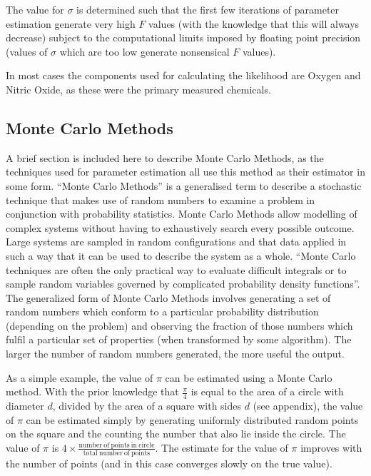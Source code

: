 The value for $\sigma$ is determined such that the first few iterations of parameter estimation generate very high $F$ values (with the knowledge that this will always decrease) subject to the computational limits imposed by floating point precision (values of $\sigma$ which are too low generate nonsensical $F$ values).

In most cases the components used for calculating the likelihood are Oxygen and Nitric Oxide, as these were the primary measured chemicals.
\subsection{Monte Carlo Methods}
A brief section is included here to describe Monte Carlo Methods, as the techniques used for parameter estimation all use this method as their estimator in some form.
``Monte Carlo Methods'' is a generalised term to describe a stochastic technique that makes use of random numbers to examine a problem in conjunction with probability statistics. Monte Carlo Methods allow modelling of complex systems without having to exhaustively search every possible outcome. Large systems are sampled in random configurations and that data applied in such a way that it can be used to describe the system as a whole. ``Monte Carlo techniques are often the only practical way to evaluate difficult integrals or to sample random variables governed by complicated probability density functions''\cite{Nakamura2010}. The generalized form of Monte Carlo Methods involves generating a set of random numbers which conform to a particular probability distribution (depending on the problem) and observing the fraction of those numbers which fulfil a particular set of properties (when transformed by some algorithm). The larger the number of random numbers generated, the more useful the output.

As a simple example, the value of $\pi$ can be estimated using a Monte Carlo method. With the prior knowledge that $\frac{\pi}{4}$ is equal to the area of a circle with diameter $d$, divided by the area of a square with sides $d$ (see appendix), the value of $\pi$ can be estimated simply by generating uniformly distributed random points on the square and the counting the number that also lie inside the circle. The value of $\pi$ is $4\times\frac{\mathrm{number~of~points~in~circle}}{\mathrm{total~number~of~points}}$. The estimate for the value of $\pi$ improves with the number of points (and in this case converges slowly on the true value).

